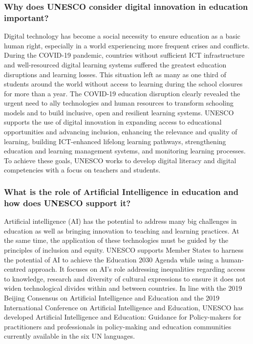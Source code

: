 \documentclass[a4paper,11pt]{article}
\begin{document}
\subsubsection{Why does UNESCO consider digital innovation in education important?}
Digital technology has become a social necessity to ensure education as a basic human right, especially in a world experiencing more frequent crises and conflicts. During the COVID-19 pandemic, countries without sufficient ICT infrastructure and well-resourced digital learning systems suffered the greatest education disruptions and learning losses. This situation left as many as one third of students around the world without access to learning during the school closures for more than a year. The COVID-19 education disruption clearly revealed the urgent need to ally technologies and human resources to transform schooling models and to build inclusive, open and resilient learning systems. UNESCO supports the use of digital innovation in expanding access to educational opportunities and advancing inclusion, enhancing the relevance and quality of learning, building ICT-enhanced lifelong learning pathways, strengthening education and learning management systems, and monitoring learning processes. To achieve these goals, UNESCO works to develop digital literacy and digital competencies with a focus on teachers and students.

\subsubsection{What is the role of Artificial Intelligence in education and how does UNESCO support it?}
Artificial intelligence (AI) has the potential to address many big challenges in education as well as bringing innovation to teaching and learning practices. At the same time, the application of these technologies must be guided by the principles of inclusion and equity. UNESCO supports Member States to harness the potential of AI to achieve the Education 2030 Agenda while using a human-centred approach. It focuses on AI’s role addressing inequalities regarding access to knowledge, research and diversity of cultural expressions to ensure it does not widen technological divides within and between countries. In line with the 2019 Beijing Consensus on Artificial Intelligence and Education and the 2019 International Conference on Artificial Intelligence and Education, UNESCO has developed Artificial Intelligence and Education: Guidance for Policy-makers for practitioners and professionals in policy-making and education communities currently available in the six UN languages.
\end{document}
